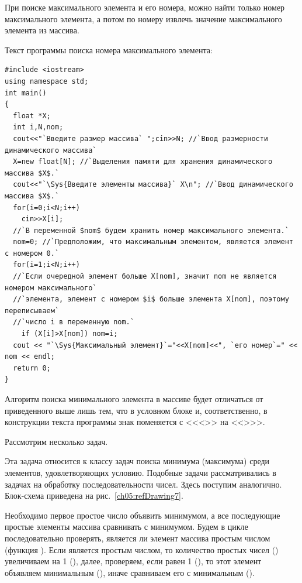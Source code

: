 При поиске максимального элемента и его номера, можно найти только номер максимального элемента, а потом по номеру извлечь
значение максимального элемента из массива.

Текст программы поиска номера максимального элемента:
\begin{lstlisting}
#include <iostream>
using namespace std;
int main()
{
  float *X;
  int i,N,nom;
  cout<<"`Введите размер массива` ";cin>>N; //`Ввод размерности динамического массива`
  X=new float[N]; //`Выделения памяти для хранения динамического массива $X$.`
  cout<<"`\Sys{Введите элементы массива}` X\n"; //`Ввод динамического массива $X$.`
  for(i=0;i<N;i++)
    cin>>X[i];
  //`В переменной $nom$ будем хранить номер максимального элемента.` 
  nom=0; //`Предположим, что максимальным элементом, является элемент с номером 0.`
  for(i=1;i<N;i++)
  //`Если очередной элемент больше X[nom], значит nom не является номером максимального`
  //`элемента, элемент с номером $i$ больше элемента X[nom], поэтому переписываем`
  //`число i в переменную nom.`
    if (X[i]>X[nom]) nom=i;
  cout << "`\Sys{Максимальный элемент}`="<<X[nom]<<", `его номер`=" << nom << endl;
  return 0;
}
\end{lstlisting}

 Алгоритм поиска минимального элемента в массиве будет отличаться от приведенного выше лишь тем, что в
условном блоке и, соответственно, в конструкции  текста программы знак поменяется с <<{<}>> на <<{>}>>.

Рассмотрим несколько задач.


Эта задача относится к классу задач поиска минимума (максимума) среди элементов, удовлетворяющих условию. Подобные
задачи рассматривались в задачах на обработку последовательности чисел. Здесь поступим аналогично. Блок-схема приведена
на рис.~\ref{ch05:refDrawing7}.

Необходимо первое простое число объявить минимумом, а все последующие простые элементы массива сравнивать с минимумом.
Будем в цикле последовательно проверять, является ли элемент массива простым числом (функция
). Если  является простым числом, то количество простых чисел
() увеличиваем на 1 (), далее, проверяем, если равен 1
(), то этот элемент объявляем минимальным (), иначе
сравниваем его с минимальным ().

